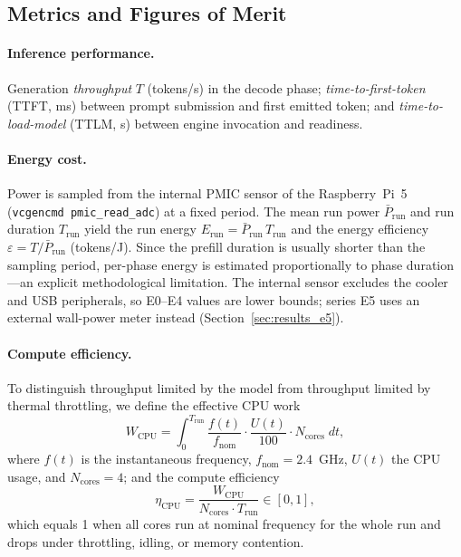 \documentclass[acmsmall,natbib=false]{acmart}
\begin{document}
\subsection{Metrics and Figures of Merit}\label{sec:metrics}

\paragraph{Inference performance.}
Generation \emph{throughput} $T$ (tokens/s) in the decode phase;
\emph{time-to-first-token} (TTFT, ms) between prompt submission and first
emitted token; and \emph{time-to-load-model} (TTLM, s) between engine
invocation and readiness.

\paragraph{Energy cost.}
Power is sampled from the internal PMIC sensor of the Raspberry~Pi~5
(\texttt{vcgencmd pmic\_read\_adc}) at a fixed period. The mean run power
$\bar{P}_{\mathrm{run}}$ and run duration $T_{\mathrm{run}}$ yield the run
energy $E_{\mathrm{run}}=\bar{P}_{\mathrm{run}}\,T_{\mathrm{run}}$ and the
energy efficiency $\varepsilon = T/\bar{P}_{\mathrm{run}}$ (tokens/J). Since
the prefill duration is usually shorter than the sampling period, per-phase
energy is estimated proportionally to phase duration---an explicit
methodological limitation. The internal sensor excludes the cooler and USB
peripherals, so E0--E4 values are lower bounds; series E5 uses an external
wall-power meter instead (Section~\ref{sec:results_e5}).

\paragraph{Compute efficiency.}
To distinguish throughput limited by the model from throughput limited by
thermal throttling, we define the effective CPU work
\begin{equation}
  W_{\mathrm{CPU}} = \int_{0}^{T_{\mathrm{run}}} \frac{f(t)}{f_{\mathrm{nom}}}
  \cdot \frac{U(t)}{100} \cdot N_{\mathrm{cores}}\;dt ,
\end{equation}
where $f(t)$ is the instantaneous frequency, $f_{\mathrm{nom}}=2.4$~GHz,
$U(t)$ the CPU usage, and $N_{\mathrm{cores}}=4$; and the compute efficiency
\begin{equation}
  \eta_{\mathrm{CPU}} = \frac{W_{\mathrm{CPU}}}{N_{\mathrm{cores}} \cdot
  T_{\mathrm{run}}} \in [0,1],
  \label{eq:eta}
\end{equation}
which equals 1 when all cores run at nominal frequency for the whole run and
drops under throttling, idling, or memory contention.
\end{document}
